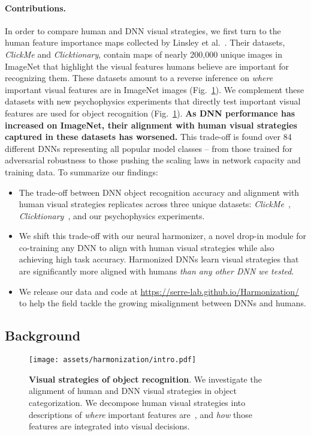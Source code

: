 \paragraph{Contributions.}
In order to compare human and DNN visual strategies, we first turn to the human feature importance maps collected by Linsley et al.~\cite{linsley2018learning, Lin2017-mj}. Their datasets, \textit{ClickMe} and \textit{Clicktionary}, contain maps of nearly 200,000 unique images in ImageNet that highlight the visual features humans believe are important for recognizing them. These datasets amount to a reverse inference on \textit{where} important visual features are in ImageNet images (Fig.~\ref{fig:harmonization:intro}). We complement these datasets with new psychophysics experiments that directly test  important visual features are used for object recognition (Fig.~\ref{fig:harmonization:intro}). \textbf{As DNN performance has increased on ImageNet, their alignment with human visual strategies captured in these datasets has worsened.} This trade-off is found over 84 different DNNs representing all popular model classes -- from those trained for adversarial robustness to those pushing the scaling laws in network capacity and training data. To summarize our findings:
\begin{itemize}[leftmargin=*]
    \item The trade-off between DNN object recognition accuracy and alignment with human visual strategies replicates across three unique datasets: \textit{ClickMe}~\cite{Linsley2019-ew}, \textit{Clicktionary}~\cite{Lin2017-mj}, and our psychophysics experiments.
    \item We shift this trade-off with our neural harmonizer, a novel drop-in module for co-training any DNN to align with human visual strategies while also achieving high task accuracy. Harmonized DNNs learn visual strategies that are significantly more aligned with humans \textit{than any other DNN we tested}.
    \item We release our data and code at \url{https://serre-lab.github.io/Harmonization/} to help the field tackle the growing misalignment between DNNs and humans.
\end{itemize}

\subsection{Background}

\begin{figure}[ht]
  \centering
    \texttt{[image: assets/harmonization/intro.pdf]}
  \caption{\textbf{Visual strategies of object recognition}. We investigate the alignment of human and DNN visual strategies in object categorization. We decompose human visual strategies into descriptions of \textit{where} important features are~\cite{Linsley2017-qe,Linsley2019-ew}, and \textit{how} those features are integrated into visual decisions.}\label{fig:harmonization:intro}
\end{figure}
